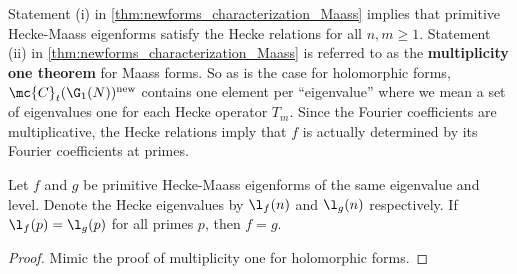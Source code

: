    Statement (i) in \cref{thm:newforms_characterization_Maass} implies that primitive Hecke-Maass eigenforms satisfy the Hecke relations for all $n,m \ge 1$. Statement (ii) in \cref{thm:newforms_characterization_Maass} is referred to as the \textbf{multiplicity one theorem} for Maass forms. So as is the case for holomorphic forms, $\mc{C}_{t}(\G_{1}(N))^{\mathrm{new}}$ contains one element per ``eigenvalue'' where we mean a set of eigenvalues one for each Hecke operator $T_{m}$. Since the Fourier coefficients are multiplicative, the Hecke relations imply that $f$ is actually determined by its Fourier coefficients at primes. 
    
    \begin{theorem}
      Let $f$ and $g$ be primitive Hecke-Maass eigenforms of the same eigenvalue and level. Denote the Hecke eigenvalues by $\l_{f}(n)$ and $\l_{g}(n)$ respectively. If $\l_{f}(p) = \l_{g}(p)$ for all primes $p$, then $f = g$.
    \end{theorem}
    \begin{proof}
      Mimic the proof of multiplicity one for holomorphic forms.
    \end{proof}

